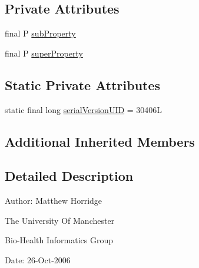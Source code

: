 \subsection*{Private Attributes}
\begin{DoxyCompactItemize}
\item 
final P \hyperlink{classuk_1_1ac_1_1manchester_1_1cs_1_1owl_1_1owlapi_1_1_o_w_l_sub_property_axiom_impl_3_01_p_01ex22572232b03223b699ed74a4771c1e6d_a864678902eacd99c6e1821087a66c7a5}{sub\-Property}
\item 
final P \hyperlink{classuk_1_1ac_1_1manchester_1_1cs_1_1owl_1_1owlapi_1_1_o_w_l_sub_property_axiom_impl_3_01_p_01ex22572232b03223b699ed74a4771c1e6d_a81fd31047eeab5c2f30bb015b090217c}{super\-Property}
\end{DoxyCompactItemize}
\subsection*{Static Private Attributes}
\begin{DoxyCompactItemize}
\item 
static final long \hyperlink{classuk_1_1ac_1_1manchester_1_1cs_1_1owl_1_1owlapi_1_1_o_w_l_sub_property_axiom_impl_3_01_p_01ex22572232b03223b699ed74a4771c1e6d_a88283b0c68a368c5cb0b2f0db333be29}{serial\-Version\-U\-I\-D} = 30406\-L
\end{DoxyCompactItemize}
\subsection*{Additional Inherited Members}


\subsection{Detailed Description}
Author\-: Matthew Horridge\par
 The University Of Manchester\par
 Bio-\/\-Health Informatics Group\par
 Date\-: 26-\/\-Oct-\/2006\par
\par
 

